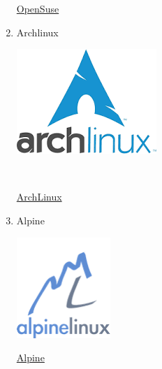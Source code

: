 \documentclass[11pt]{article}
\begin{document}
\begin{enumerate}
\href{https://www.opensuse.org/}{OpenSuse}

\item Archlinux
\label{sec:orgbbce63d}
\begin{center}
\includegraphics[width=.9\linewidth]{Versiones/archlinux.png}
\end{center}  

\href{https://www.archlinux.org/}{ArchLinux}

\item Alpine
\label{sec:org39b3ed0}
\begin{center}
\includegraphics[width=.9\linewidth]{Versiones/alpine.png}
\end{center}

\href{https://alpinelinux.org/}{Alpine}
\end{enumerate}
\end{document}
